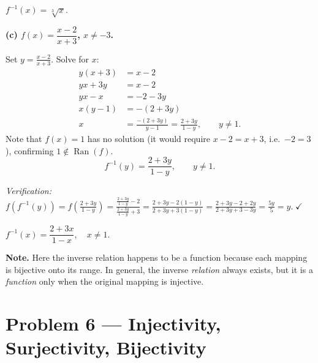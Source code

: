 \documentclass[12pt, a4paper]{article}
\begin{document}
\begin{answerbox}
$f^{-1}(x) = \sqrt[3]{x}.$
\end{answerbox}

\bigskip
\textbf{(c)\; $f(x) = \dfrac{x-2}{x+3}$, \quad $x \neq -3$.}

Set $y = \frac{x-2}{x+3}$. Solve for $x$:
\begin{align*}
  y(x+3) &= x - 2 \\
  yx + 3y &= x - 2 \\
  yx - x &= -2 - 3y \\
  x(y - 1) &= -(2 + 3y) \\
  x &= \frac{-(2+3y)}{y-1} = \frac{2+3y}{1-y}, \qquad y \neq 1.
\end{align*}
Note that $f(x) = 1$ has no solution (it would require $x - 2 = x + 3$, i.e.\ $-2 = 3$), confirming $1 \notin \operatorname{Ran}(f)$.
\[
  \boxed{f^{-1}(y) = \frac{2 + 3y}{1 - y}, \qquad y \neq 1.}
\]

\emph{Verification:}\;
$f(f^{-1}(y)) = f\!\left(\frac{2+3y}{1-y}\right)
= \frac{\frac{2+3y}{1-y} - 2}{\frac{2+3y}{1-y} + 3}
= \frac{2+3y - 2(1-y)}{2+3y + 3(1-y)}
= \frac{2+3y-2+2y}{2+3y+3-3y}
= \frac{5y}{5} = y.\;\checkmark$

\begin{answerbox}
$f^{-1}(x) = \dfrac{2+3x}{1-x}, \quad x \neq 1.$
\end{answerbox}

\bigskip
\textbf{Note.}\; Here the inverse relation happens to be a function because each mapping is bijective onto its range. In general, the inverse \emph{relation} always exists, but it is a \emph{function} only when the original mapping is injective.

\newpage
\section{Problem 6 --- Injectivity, Surjectivity, Bijectivity}
\end{document}

